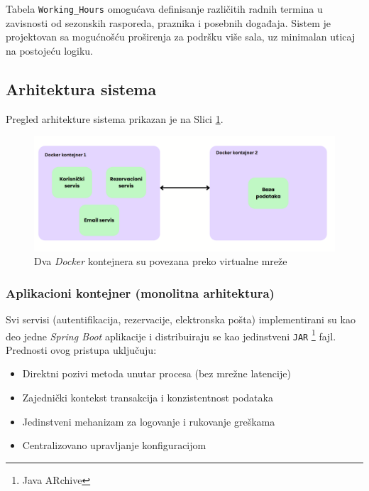 \documentclass[12pt]{article}
\begin{document}
    Tabela \texttt{Working\_Hours} omogućava definisanje različitih radnih termina u 
    zavisnosti od sezonskih rasporeda, praznika i posebnih događaja. Sistem je projektovan sa 
    mogućnošću proširenja za podršku više sala, uz minimalan uticaj na postojeću logiku.

    \newpage

    \subsection{Arhitektura sistema}

    Pregled arhitekture sistema prikazan je na Slici \ref{fig:arhitektura_sistema}.

    \begin{figure}[h!]
        \vspace{0.5cm}
        \centering
        \includegraphics[width=1.0\textwidth]{sistem.png}
        \caption{Dva \textit{Docker} kontejnera su povezana preko virtualne mreže}
        \label{fig:arhitektura_sistema}
    \end{figure}

    \subsubsection*{Aplikacioni kontejner (monolitna arhitektura)}

    Svi servisi (autentifikacija, rezervacije, elektronska pošta) implementirani su kao deo jedne \textit{Spring Boot} aplikacije i distribuiraju se kao jedinstveni \texttt{JAR} \footnote{Java ARchive} fajl. Prednosti ovog pristupa uključuju:

    \begin{itemize}
    \item Direktni pozivi metoda unutar procesa (bez mrežne latencije)
    \item Zajednički kontekst transakcija i konzistentnost podataka
    \item Jedinstveni mehanizam za logovanje i rukovanje greškama
    \item Centralizovano upravljanje konfiguracijom
    \end{itemize}
\end{document}
